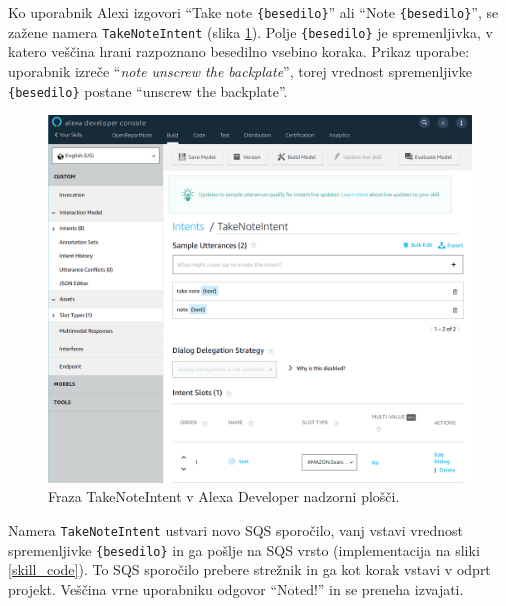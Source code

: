 \documentclass[a4paper, 12pt]{book}
\begin{document}
Ko uporabnik Alexi izgovori \enquote{Take note \texttt{\{besedilo\}}} ali \enquote{Note \texttt{\{besedilo\}}}, se zažene namera \texttt{TakeNoteIntent} (slika \ref{TakeNoteIntent}).
Polje \texttt{\{besedilo\}} je spremenljivka, v katero veščina hrani razpoznano besedilno vsebino koraka.
Prikaz uporabe: uporabnik izreče \enquote{\textit{note unscrew the backplate}}, torej vrednost spremenljivke \texttt{\{besedilo\}} postane \enquote{unscrew the backplate}.



\begin{figure}[H]
\begin{center}
\includegraphics[width=13cm]{intent_literal}
\end{center}
\caption{Fraza TakeNoteIntent v Alexa Developer nadzorni plošči.}
\label{TakeNoteIntent}
\end{figure}

Namera \texttt{TakeNoteIntent} ustvari novo SQS sporočilo, vanj vstavi vrednost spremenljivke \texttt{\{besedilo\}} in ga pošlje na SQS vrsto (implementacija na sliki \ref{skill_code}).
To SQS sporočilo prebere strežnik in ga kot korak vstavi v odprt projekt.
Veščina vrne uporabniku odgovor \enquote{Noted!} in se preneha izvajati.


\end{document}
